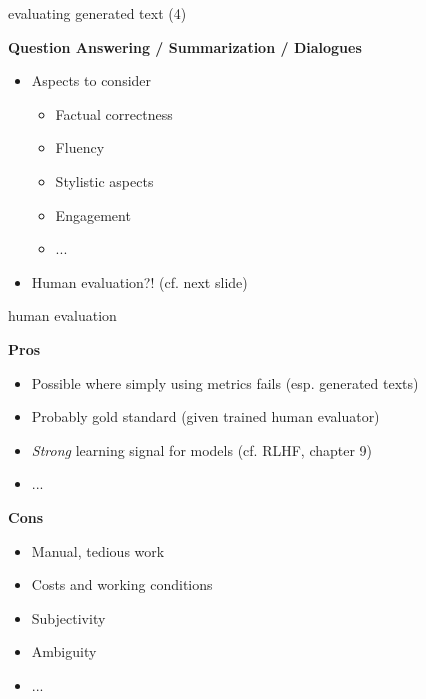
\begin{frame}{evaluating generated text (4)}

\vfill

\textbf{Question Answering / Summarization / Dialogues}

\begin{itemize}
	\item Aspects to consider
			\begin{itemize}
				\item Factual correctness
				\item Fluency
				\item Stylistic aspects
				\item Engagement
				\item ...
			\end{itemize}
	\item Human evaluation?! (cf. next slide)
\end{itemize}

\vfill

\end{frame}


\begin{frame}{human evaluation}

\vfill

\textbf{Pros}

\begin{itemize}
	\item Possible where simply using metrics fails (esp. generated texts)
	\item Probably gold standard (given trained human evaluator)
	\item \textit{Strong} learning signal for models (cf. RLHF, chapter 9)
	\item ...
\end{itemize}

\vspace{.3cm}

\textbf{Cons}

\begin{itemize}
	\item Manual, tedious work
  \item Costs and working conditions
	\item Subjectivity
	\item Ambiguity
	\item ...
\end{itemize}

\vfill

\end{frame}

